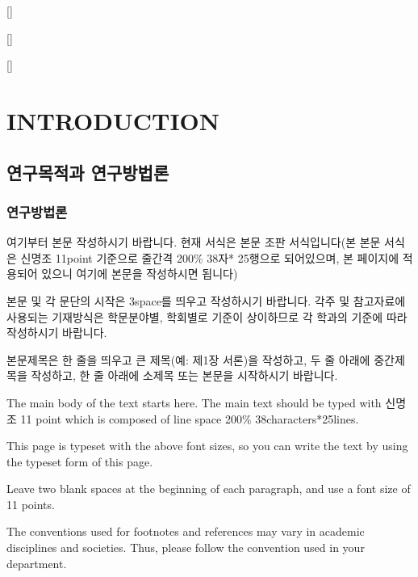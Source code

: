 [\fontsize{11pt}{11pt}\selectfont]
[]
[]

\fontsize{11pt}{11pt}\selectfont
\setlength{\parindent}{1.5em}
\setlength{\parskip}{0pt}
\chapter{INTRODUCTION}
\section{연구목적과 연구방법론}
\subsection{연구방법론}

여기부터 본문 작성하시기 바랍니다. 현재 서식은 본문 조판 서식입니다(본 본문 서식은 
신명조 11point 기준으로 줄간격 200\% 38자* 25행으로 되어있으며, 본 페이지에
적용되어 있으니 여기에 본문을 작성하시면 됩니다)\par
본문 및 각 문단의 시작은 3space를 띄우고 작성하시기 바랍니다.
각주 및 참고자료에 사용되는 기재방식은 학문분야별, 학회별로 기준이 상이하므로
각 학과의 기준에 따라 작성하시기 바랍니다.\par
본문제목은 한 줄을 띄우고 큰 제목(예: 제1장 서론)을 작성하고, 두 줄 아래에 
중간제목을 작성하고, 한 줄 아래에 소제목 또는 본문을 시작하시기 바랍니다.\par
The main body of the text starts here. The main text should be typed
with 신명조 11 point which is composed of line space 200\% 38characters*25lines.\par
This page is typeset with the above font sizes, so you can write the text by
using the typeset form of this page.\par
Leave two blank spaces at the beginning of each paragraph, and use a font size
of 11 points.\par
The conventions used for footnotes and references may vary in 
academic disciplines and societies. Thus, please follow the convention used in
your department.


